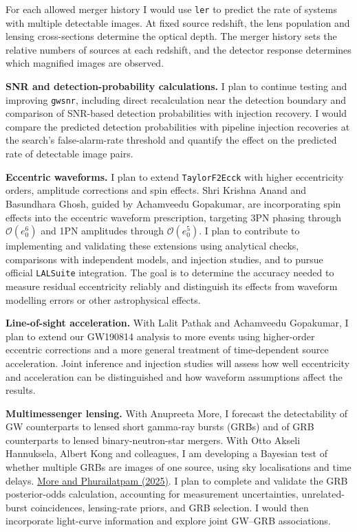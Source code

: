 \documentclass[11pt]{article}
\begin{document}
For each allowed merger history I would use \texttt{ler} to predict the rate of systems with multiple detectable images. At fixed source redshift, the lens population and lensing cross-sections determine the optical depth. The merger history sets the relative numbers of sources at each redshift, and the detector response determines which magnified images are observed.

\textbf{SNR and detection-probability calculations.} I plan to continue testing and improving \texttt{gwsnr}, including direct recalculation near the detection boundary and comparison of SNR-based detection probabilities with injection recovery. I would compare the predicted detection probabilities with pipeline injection recoveries at the search's false-alarm-rate threshold and quantify the effect on the predicted rate of detectable image pairs.

\textbf{Eccentric waveforms.} I plan to extend \texttt{TaylorF2Ecck} with higher eccentricity orders, amplitude corrections and spin effects. Shri Krishna Anand and Basundhara Ghosh, guided by Achamveedu Gopakumar, are incorporating spin effects into the eccentric waveform prescription, targeting 3PN phasing through $\mathcal{O}(e_0^6)$ and 1PN amplitudes through $\mathcal{O}(e_0^5)$. I plan to contribute to implementing and validating these extensions using analytical checks, comparisons with independent models, and injection studies, and to pursue official \texttt{LALSuite} integration. The goal is to determine the accuracy needed to measure residual eccentricity reliably and distinguish its effects from waveform modelling errors or other astrophysical effects.

\textbf{Line-of-sight acceleration.} With Lalit Pathak and Achamveedu Gopakumar, I plan to extend our GW190814 analysis to more events using higher-order eccentric corrections and a more general treatment of time-dependent source acceleration. Joint inference and injection studies will assess how well eccentricity and acceleration can be distinguished and how waveform assumptions affect the results.

\textbf{Multimessenger lensing.} With Anupreeta More, I forecast the detectability of GW counterparts to lensed short gamma-ray bursts (GRBs) and of GRB counterparts to lensed binary-neutron-star mergers. With Otto Akseli Hannuksela, Albert Kong and colleagues, I am developing a Bayesian test of whether multiple GRBs are images of one source, using sky localisations and time delays. \href{https://doi.org/10.1098/rsta.2024.0127}{More and Phurailatpam (2025)}. I plan to complete and validate the GRB posterior-odds calculation, accounting for measurement uncertainties, unrelated-burst coincidences, lensing-rate priors, and GRB selection. I would then incorporate light-curve information and explore joint GW--GRB associations.
\end{document}
